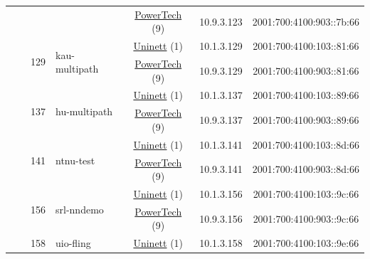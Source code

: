 \begin{small}
\begin{center}
\begin{longtable}{|c|c|c|c|c|c|c|c|}
  &  &  &  & \multicolumn{2}{|c|}{\tiny{\href{http://www.powertech.no}{PowerTech} (9)}} & \tiny{10.9.3.123} & \tiny{2001:700:4100:903::7b:66} \\* \cline{3-3}\cline{4-4}\cline{5-5}\cline{6-6}\cline{7-7}\cline{8-8}
  &  & \multirow{2}{*}{\tiny{129}} & \multicolumn{1}{|l|}{\multirow{2}{*}{\tiny{kau-multipath}}} & \multicolumn{2}{|c|}{\tiny{\href{https://www.uninett.no}{Uninett} (1)}} & \tiny{10.1.3.129} & \tiny{2001:700:4100:103::81:66} \\* \cline{5-5}\cline{6-6}\cline{7-7}\cline{8-8}
  &  &  &  & \multicolumn{2}{|c|}{\tiny{\href{http://www.powertech.no}{PowerTech} (9)}} & \tiny{10.9.3.129} & \tiny{2001:700:4100:903::81:66} \\* \cline{3-3}\cline{4-4}\cline{5-5}\cline{6-6}\cline{7-7}\cline{8-8}
  &  & \multirow{2}{*}{\tiny{137}} & \multicolumn{1}{|l|}{\multirow{2}{*}{\tiny{hu-multipath}}} & \multicolumn{2}{|c|}{\tiny{\href{https://www.uninett.no}{Uninett} (1)}} & \tiny{10.1.3.137} & \tiny{2001:700:4100:103::89:66} \\* \cline{5-5}\cline{6-6}\cline{7-7}\cline{8-8}
  &  &  &  & \multicolumn{2}{|c|}{\tiny{\href{http://www.powertech.no}{PowerTech} (9)}} & \tiny{10.9.3.137} & \tiny{2001:700:4100:903::89:66} \\* \cline{3-3}\cline{4-4}\cline{5-5}\cline{6-6}\cline{7-7}\cline{8-8}
  &  & \multirow{2}{*}{\tiny{141}} & \multicolumn{1}{|l|}{\multirow{2}{*}{\tiny{ntnu-test}}} & \multicolumn{2}{|c|}{\tiny{\href{https://www.uninett.no}{Uninett} (1)}} & \tiny{10.1.3.141} & \tiny{2001:700:4100:103::8d:66} \\* \cline{5-5}\cline{6-6}\cline{7-7}\cline{8-8}
  &  &  &  & \multicolumn{2}{|c|}{\tiny{\href{http://www.powertech.no}{PowerTech} (9)}} & \tiny{10.9.3.141} & \tiny{2001:700:4100:903::8d:66} \\* \cline{3-3}\cline{4-4}\cline{5-5}\cline{6-6}\cline{7-7}\cline{8-8}
  &  & \multirow{2}{*}{\tiny{156}} & \multicolumn{1}{|l|}{\multirow{2}{*}{\tiny{srl-nndemo}}} & \multicolumn{2}{|c|}{\tiny{\href{https://www.uninett.no}{Uninett} (1)}} & \tiny{10.1.3.156} & \tiny{2001:700:4100:103::9c:66} \\* \cline{5-5}\cline{6-6}\cline{7-7}\cline{8-8}
  &  &  &  & \multicolumn{2}{|c|}{\tiny{\href{http://www.powertech.no}{PowerTech} (9)}} & \tiny{10.9.3.156} & \tiny{2001:700:4100:903::9c:66} \\* \cline{3-3}\cline{4-4}\cline{5-5}\cline{6-6}\cline{7-7}\cline{8-8}
  &  & \multirow{2}{*}{\tiny{158}} & \multicolumn{1}{|l|}{\multirow{2}{*}{\tiny{uio-fling}}} & \multicolumn{2}{|c|}{\tiny{\href{https://www.uninett.no}{Uninett} (1)}} & \tiny{10.1.3.158} & \tiny{2001:700:4100:103::9e:66} \\* \cline{5-5}\cline{6-6}\cline{7-7}\cline{8-8}

\end{longtable}
\end{center}
\end{small}
